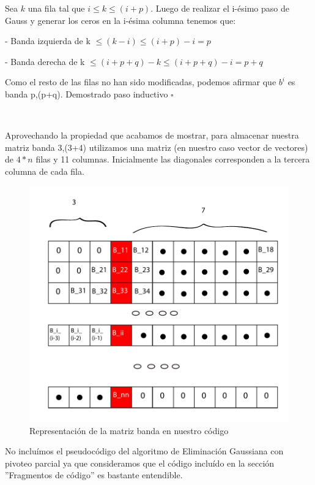 Sea $k$ una fila tal que $i \leq k \leq (i+p)$. Luego de realizar el i-ésimo paso de Gauss y generar los ceros en la 
i-ésima columna tenemos que:

- Banda izquierda de k $\leq (k-i) \leq (i+p)-i = p$

- Banda derecha de k $ \leq (i+p+q)-k \leq (i+p+q)-i = p+q $

Como el resto de las filas no han sido modificadas, podemos afirmar que $b^{i}$ es banda p,(p+q). 
Demostrado paso inductivo $\square$

~

Aprovechando la propiedad que acabamos de mostrar, para almacenar nuestra matriz banda 3,(3+4) utilizamos una
matriz (en nuestro caso vector de vectores) de $4*n$ filas y 11 columnas. Inicialmente las diagonales corresponden
a la tercera columna de cada fila.

\begin{figure}[!h]
	\begin{center}
		  \includegraphics[scale=0.5]{Imagenes/im_13.pdf}
		  \caption{Representación de la matriz banda en nuestro código}
		  \label{fig:contra1}
	\end{center}
\end{figure}
\FloatBarrier

No incluímos el pseudocódigo del algoritmo de Eliminación Gaussiana con pivoteo parcial ya que consideramos que el
código incluído en la sección ''Fragmentos de código'' es bastante entendible.
